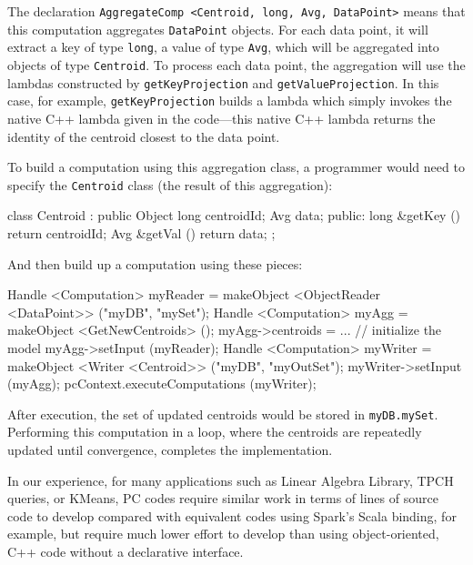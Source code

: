 \noindent 
The declaration \texttt{AggregateComp <Centroid, long, Avg, DataPoint>} means that this computation aggregates
\texttt{DataPoint} objects.  For each data point, it will extract a key of type \texttt{long}, a value of type \texttt{Avg}, which will be
aggregated into objects of type \texttt{Centroid}.  To process each data point, the aggregation will use the lambdas constructed by
\texttt{getKeyProjection} and \texttt{getValueProjection}.  
In this case, for example,
\texttt{getKeyProjection} builds a lambda which simply invokes the native C++ lambda given in the code---this
native C++ lambda returns the identity of the centroid closest to the data point.

To build a computation using this aggregation class, a programmer would need to specify the \texttt{Centroid} class (the result of this aggregation):

\begin{code}
class Centroid : public Object {
	long centroidId; 
	Avg data;
public:
	long &getKey () {return centroidId;}
	Avg &getVal () {return data;}
};
\end{code}

\noindent
And then build up a computation using these pieces:

\begin{code}
Handle <Computation> myReader = 
    makeObject <ObjectReader <DataPoint>> ("myDB", "mySet");
Handle <Computation> myAgg = makeObject <GetNewCentroids> ();
myAgg->centroids = ... // initialize the model
myAgg->setInput (myReader);
Handle <Computation> myWriter =  makeObject <Writer <Centroid>> ("myDB", "myOutSet");
    myWriter->setInput (myAgg);
pcContext.executeComputations (myWriter);
\end{code}

\noindent After execution, the set of updated centroids would be stored in \texttt{myDB.mySet}.
Performing this computation in a loop, where the centroids are repeatedly updated until convergence, completes the implementation.

In our experience, for many applications such as Linear Algebra
Library, TPCH queries, or KMeans, PC codes require similar work in
terms of lines of source code to develop compared with equivalent codes using Spark's Scala binding, for
example, but require much lower effort to develop than using
object-oriented, C++ code without a declarative interface.

